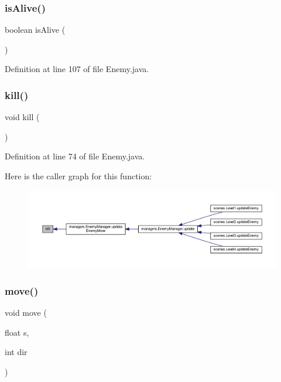 \subsubsection{\texorpdfstring{is\+Alive()}{isAlive()}}
{\footnotesize\ttfamily boolean is\+Alive (\begin{DoxyParamCaption}{ }\end{DoxyParamCaption})}



Definition at line 107 of file Enemy.\+java.

\mbox{\label{classenemies_1_1_enemy_aae9d52caad9fb2892deeb25596cfd2ab}} 
\subsubsection{\texorpdfstring{kill()}{kill()}}
{\footnotesize\ttfamily void kill (\begin{DoxyParamCaption}{ }\end{DoxyParamCaption})}



Definition at line 74 of file Enemy.\+java.

Here is the caller graph for this function\+:
\nopagebreak
\begin{figure}[H]
\begin{center}
\leavevmode
\includegraphics[width=350pt]{classenemies_1_1_enemy_aae9d52caad9fb2892deeb25596cfd2ab_icgraph}
\end{center}
\end{figure}
\mbox{\label{classenemies_1_1_enemy_a474fd9bb876d55f65850132777c539d8}} 
\subsubsection{\texorpdfstring{move()}{move()}}
{\footnotesize\ttfamily void move (\begin{DoxyParamCaption}\item[{float}]{s,  }\item[{int}]{dir }\end{DoxyParamCaption})}



